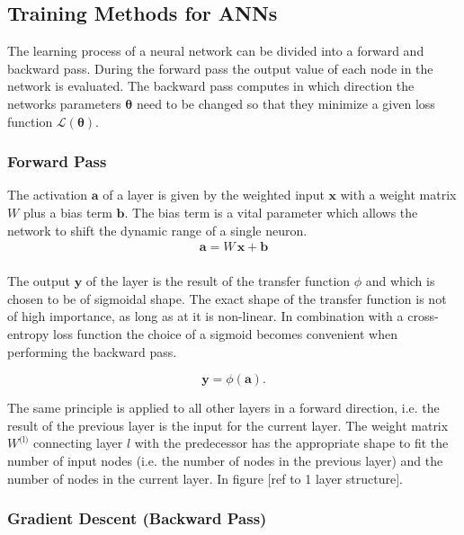 \subsection{Training Methods for ANNs}
\label{trainingANN}

The learning process of a neural network can be divided into a forward and backward pass. During the forward pass the output value of each node in the network is evaluated. The backward pass computes in which direction the networks parameters $\mathbf{\theta}$ need to be changed so that they minimize a given loss function $\mathcal{L}(\mathbf{\theta})$.

\subsubsection{Forward Pass}
The activation $\mathbf{a}$ of a layer is given by the weighted input $\mathbf{x}$ with a weight matrix $W$ plus a bias term $\mathbf{b}$. The bias term is a vital parameter which allows the network to shift the dynamic range of a single neuron. 
\begin{align}
\mathbf{a} = W \, \mathbf{x} + \mathbf{b} \\
\end{align}
 
The output $\mathbf{y}$ of the layer is the result of the transfer function $\phi$ and which is chosen to be of sigmoidal shape. The exact shape of the transfer function is not of high importance, as long as at it is non-linear. In combination with a cross-entropy loss function the choice of a sigmoid becomes convenient when performing the backward pass.

\begin{equation}
\mathbf{y} = \phi(\mathbf{a}).
\end{equation}

The same principle is applied to all other layers in a forward direction, i.e. the result of the previous layer is the input for the current layer. The weight matrix $W^{\text{(l)}}$ connecting layer $l$ with the predecessor has the appropriate shape to fit the number of input nodes (i.e. the number of nodes in the previous layer) and the number of nodes in the current layer. In figure [ref to 1 layer structure].

\subsubsection{Gradient Descent (Backward Pass)}

